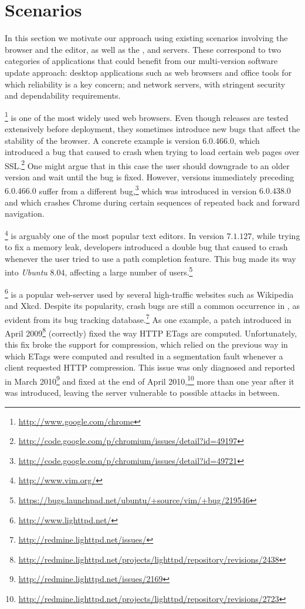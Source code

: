 \section{Scenarios}
\label{multi-version:scenarios}

In this section we motivate our approach using existing scenarios involving the
\chrome browser and the \vim editor, as well as the \lighttpd, \redis and \vsftpd
servers. These correspond to two categories of applications that could benefit
from our multi-version software update approach: desktop applications such as
web browsers and office tools for which reliability is a key concern; and
network servers, with stringent security and dependability requirements.

\gchrome\footnote{\url{http://www.google.com/chrome}} is one of the most widely
used web browsers.  Even though \chrome releases are tested extensively before
deployment, they sometimes introduce new bugs that affect the stability of the
browser.  A concrete example is version $6.0.466.0$, which introduced a bug
that caused \chrome to crash when trying to load certain web pages over
SSL.\footnote{\url{http://code.google.com/p/chromium/issues/detail?id=49197}}
One might argue that in this case the user should downgrade to an older version
and wait until the bug is fixed. However, versions immediately preceding
$6.0.466.0$ suffer from a different
bug,\footnote{\url{http://code.google.com/p/chromium/issues/detail?id=49721}}
which was introduced in version $6.0.438.0$ and which crashes Chrome during
certain sequences of repeated back and forward navigation.

\vim\footnote{\url{http://www.vim.org/}} is arguably one of the most popular
text editors.  In version $7.1.127$, while trying to fix a memory leak,
\vim developers introduced a double  bug that caused \vim to
crash whenever the user tried to use a path completion feature.  This bug made
its way into \textit{Ubuntu} $8.04$, affecting a large number of
users.\footnote{\url{https://bugs.launchpad.net/ubuntu/+source/vim/+bug/219546}}

\lighttpd\footnote{\url{http://www.lighttpd.net/}} is a popular web-server used
by several high-traffic websites such as Wikipedia and Xkcd.
Despite its popularity, crash bugs are still a common
occurrence in \lighttpd, as evident from its bug tracking
database.\footnote{\url{http://redmine.lighttpd.net/issues/}}
As one example, a patch introduced in April
2009\footnote{\url{http://redmine.lighttpd.net/projects/lighttpd/repository/revisions/2438}}
(correctly) fixed the way HTTP ETags are computed.
Unfortunately, this fix broke the support for compression, which relied on the
previous way in which ETags were computed and resulted in a segmentation fault
whenever a client requested HTTP compression.  This issue was only diagnosed
and reported in March
2010\footnote{\url{http://redmine.lighttpd.net/issues/2169}} and fixed at the
end of April
2010,\footnote{\url{http://redmine.lighttpd.net/projects/lighttpd/repository/revisions/2723}}
more than one year after it was introduced, leaving the server vulnerable to
possible attacks in between.


